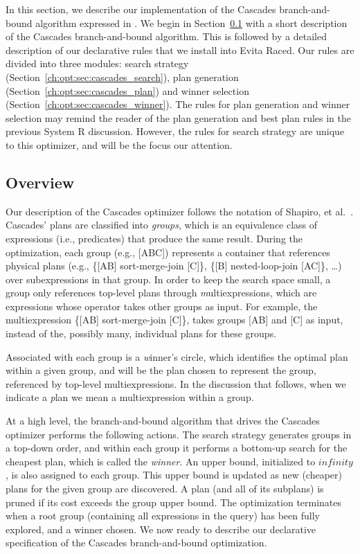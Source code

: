 In this section, we describe our implementation of the Cascades
branch-and-bound algorithm expressed in \OVERLOG.  We begin in
Section~\ref{ch:opt:sec:overview} with a short description of the Cascades
branch-and-bound algorithm.  This is followed by a detailed description of our
declarative rules that we install into Evita Raced.  Our rules are divided
into three modules: search strategy
(Section~\ref{ch:opt:sec:cascades_search}), plan generation
(Section~\ref{ch:opt:sec:cascades_plan}) and winner selection
(Section~\ref{ch:opt:sec:cascades_winner}).  The rules for plan generation and
winner selection may remind the reader of the plan generation and best plan
rules in the previous System R discussion.  However, the rules for search strategy
are unique to this optimizer, and will be the focus our attention.

\subsection{Overview}
\label{ch:opt:sec:overview}

Our description of the Cascades optimizer follows the notation of Shapiro, et
al.~\cite{Shapiro-opt}.  Cascades' plans are classified into {\em groups},
which is an equivalence class of expressions (i.e., predicates) that produce
the same result.  During the optimization, each group (e.g., [ABC]) represents
a container that references physical plans (e.g., \{[AB] sort-merge-join
[C]\}, \{[B] nested-loop-join [AC]\}, \ldots) over subexpressions in that
group.  In order to keep the search space small, a group only references
top-level plans through {\emph multiexpressions}, which are expressions whose
operator takes other groups as input. For example, the multiexpression \{[AB]
sort-merge-join [C]\}, takes groups [AB] and [C] as input, instead of the,
possibly many, individual plans for these groups.  

Associated with each group is a {\emph winner's circle}, which identifies the
optimal plan within a given group, and will be the plan chosen to represent the
group, referenced by top-level multiexpressions.  In the discussion that follows,
when we indicate a {\emph plan} we mean a multiexpression within a group.

At a high level, the branch-and-bound algorithm that drives the Cascades
optimizer performs the following actions.  The search strategy generates groups
in a top-down order, and within each group it performs a bottom-up search for
the cheapest plan, which is called the {\em winner}.  An upper bound,
initialized to $infinity$, is also assigned to each group.  This upper bound is
updated as new (cheaper) plans for the given group are discovered.  A plan (and
all of its subplans) is pruned if its cost exceeds the group upper bound.  The
optimization terminates when a root group (containing all expressions in the
query) has been fully explored, and a winner chosen.  We now ready to describe
our declarative specification of the Cascades branch-and-bound optimization.

